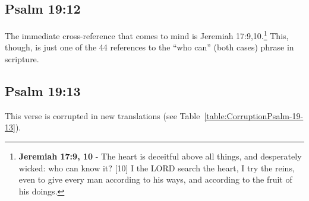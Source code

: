 \subsection{Psalm 19:12}
The immediate cross-reference that comes to mind is Jeremiah 17:9,10.\footnote{\textbf{Jeremiah 17:9, 10} - The heart is deceitful above all things, and desperately wicked: who can know it? [10] I the LORD search the heart, I try the reins, even to give every man according to his ways, and according to the fruit of his doings.} This, though, is just one of the 44 references to the ``who can'' (both cases) phrase in scripture.



\subsection{Psalm 19:13}
This verse is corrupted in new translations (see Table~\ref{table:CorruptionPsalm-19-13}).


